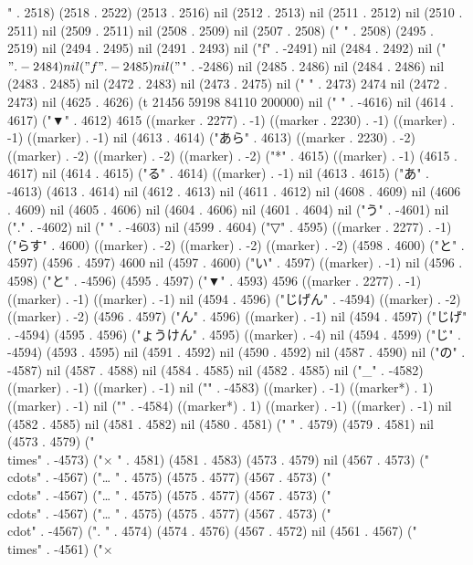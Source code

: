 " . 2518) (2518 . 2522) (2513 . 2516) nil (2512 . 2513) nil (2511 . 2512) nil (2510 . 2511) nil (2509 . 2511) nil (2508 . 2509) nil (2507 . 2508) (" " . 2508) (2495 . 2519) nil (2494 . 2495) nil (2491 . 2493) nil ("f" . -2491) nil (2484 . 2492) nil ("$" . -2484) nil ("f" . -2485) nil ("$" . -2486) nil (2485 . 2486) nil (2484 . 2486) nil (2483 . 2485) nil (2472 . 2483) nil (2473 . 2475) nil (" " . 2473) 2474 nil (2472 . 2473) nil (4625 . 4626) (t 21456 59198 84110 200000) nil (" " . -4616) nil (4614 . 4617) ("▼" . 4612) 4615 ((marker . 2277) . -1) ((marker . 2230) . -1) ((marker) . -1) ((marker) . -1) nil (4613 . 4614) ("あら" . 4613) ((marker . 2230) . -2) ((marker) . -2) ((marker) . -2) ((marker) . -2) ("*" . 4615) ((marker) . -1) (4615 . 4617) nil (4614 . 4615) ("る" . 4614) ((marker) . -1) nil (4613 . 4615) ("あ" . -4613) (4613 . 4614) nil (4612 . 4613) nil (4611 . 4612) nil (4608 . 4609) nil (4606 . 4609) nil (4605 . 4606) nil (4604 . 4606) nil (4601 . 4604) nil ("う" . -4601) nil ("." . -4602) nil (" " . -4603) nil (4599 . 4604) ("▽" . 4595) ((marker . 2277) . -1) ("らす" . 4600) ((marker) . -2) ((marker) . -2) ((marker) . -2) (4598 . 4600) ("と" . 4597) (4596 . 4597) 4600 nil (4597 . 4600) ("い" . 4597) ((marker) . -1) nil (4596 . 4598) ("と" . -4596) (4595 . 4597) ("▼" . 4593) 4596 ((marker . 2277) . -1) ((marker) . -1) ((marker) . -1) nil (4594 . 4596) ("じげん" . -4594) ((marker) . -2) ((marker) . -2) (4596 . 4597) ("ん" . 4596) ((marker) . -1) nil (4594 . 4597) ("じげ" . -4594) (4595 . 4596) ("ょうけん" . 4595) ((marker) . -4) nil (4594 . 4599) ("じ" . -4594) (4593 . 4595) nil (4591 . 4592) nil (4590 . 4592) nil (4587 . 4590) nil ("の" . -4587) nil (4587 . 4588) nil (4584 . 4585) nil (4582 . 4585) nil ("_" . -4582) ((marker) . -1) ((marker) . -1) nil ("{" . -4583) ((marker) . -1) ((marker*) . 1) ((marker) . -1) nil ("}" . -4584) ((marker*) . 1) ((marker) . -1) ((marker) . -1) nil (4582 . 4585) nil (4581 . 4582) nil (4580 . 4581) (" " . 4579) (4579 . 4581) nil (4573 . 4579) ("\\times" . -4573) ("×
" . 4581) (4581 . 4583) (4573 . 4579) nil (4567 . 4573) ("\\cdots" . -4567) ("…
" . 4575) (4575 . 4577) (4567 . 4573) ("\\cdots" . -4567) ("…
" . 4575) (4575 . 4577) (4567 . 4573) ("\\cdots" . -4567) ("…
" . 4575) (4575 . 4577) (4567 . 4573) ("\\cdot" . -4567) (".
" . 4574) (4574 . 4576) (4567 . 4572) nil (4561 . 4567) ("\\times" . -4561) ("×
